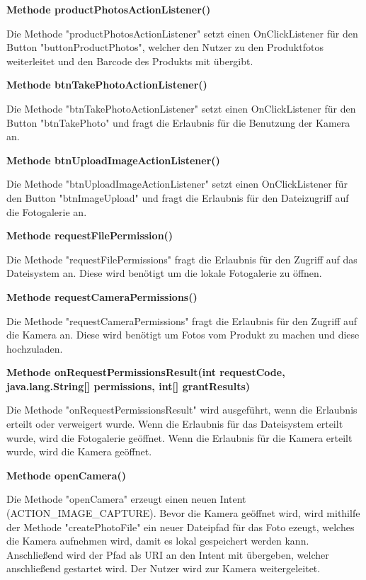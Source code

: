 \documentclass{scrartcl}
\begin{document}
\noindent\textbf{Methode productPhotosActionListener()} 

\noindent Die Methode "productPhotosActionListener" setzt einen OnClickListener für den Button "buttonProductPhotos", welcher den Nutzer zu den Produktfotos weiterleitet und den Barcode des Produkts mit übergibt. \newline

\noindent\textbf{Methode btnTakePhotoActionListener()} 

\noindent Die Methode "btnTakePhotoActionListener" setzt einen OnClickListener für den Button "btnTakePhoto" und fragt die Erlaubnis für die Benutzung der Kamera an. \newline

\noindent\textbf{Methode btnUploadImageActionListener()} 

\noindent Die Methode "btnUploadImageActionListener" setzt einen OnClickListener für den Button "btnImageUpload" und fragt die Erlaubnis für den Dateizugriff auf die Fotogalerie an. \newline 

\noindent\textbf{Methode requestFilePermission()} 

\noindent Die Methode "requestFilePermissions" fragt die Erlaubnis für den Zugriff auf das Dateisystem an. Diese wird benötigt um die lokale Fotogalerie zu öffnen. \newline

\noindent\textbf{Methode requestCameraPermissions()} 

\noindent Die Methode "requestCameraPermissions" fragt die Erlaubnis für den Zugriff auf die Kamera an. Diese wird benötigt um Fotos vom Produkt zu machen und diese hochzuladen. \newline 

\noindent\textbf{Methode onRequestPermissionsResult(int requestCode, \newline java.lang.String[] permissions, int[] grantResults)} 

\noindent Die Methode "onRequestPermissionsResult" wird ausgeführt, wenn die Erlaubnis erteilt oder verweigert wurde. Wenn die Erlaubnis für das Dateisystem erteilt wurde, wird die Fotogalerie geöffnet. Wenn die Erlaubnis für die Kamera erteilt wurde, wird die Kamera geöffnet. \newline 

\noindent\textbf{Methode openCamera()} 

\noindent Die Methode "openCamera" erzeugt einen neuen Intent (ACTION\_IMAGE\_CAPTURE). Bevor die Kamera geöffnet wird, wird mithilfe der Methode "createPhotoFile" ein neuer Dateipfad für das Foto ezeugt, welches die Kamera aufnehmen wird, damit es lokal gespeichert werden kann. Anschließend wird der Pfad als URI an den Intent mit übergeben, welcher anschließend gestartet wird. Der Nutzer wird zur Kamera weitergeleitet. \newline 
\end{document}
